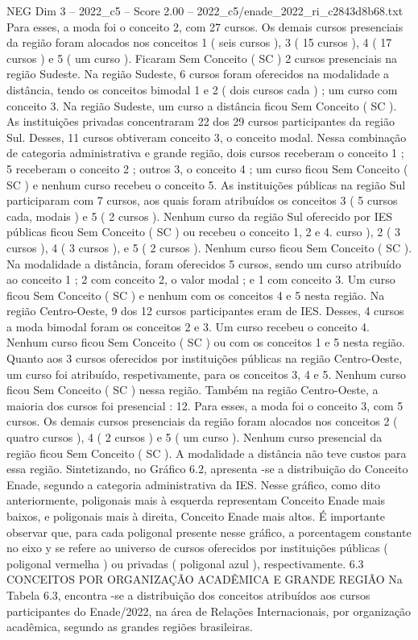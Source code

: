 \begin{textsample}{NEG Dim 3 – 2022\_c5 – Score 2.00 – 2022\_c5/enade\_2022\_ri\_c2843d8b68.txt}
Para esses, a moda foi o conceito 2, com 27 cursos.
Os demais cursos presenciais da região foram alocados nos conceitos 1 ( seis cursos ), 3 ( 15 cursos ), 4 ( 17 cursos ) e 5 ( um curso ).
Ficaram Sem Conceito ( SC ) 2 cursos presenciais na região Sudeste.
Na região Sudeste, 6 cursos foram oferecidos na modalidade a distância, tendo os conceitos bimodal 1 e 2 ( dois cursos cada ) ; um curso com conceito 3.
Na região Sudeste, um curso a distância ficou Sem Conceito ( SC ).
As instituições privadas concentraram 22 dos 29 cursos participantes da região Sul.
Desses, 11 cursos obtiveram conceito 3, o conceito modal.
Nessa combinação de categoria administrativa e grande região, dois cursos receberam o conceito 1 ; 5 receberam o conceito 2 ; outros 3, o conceito 4 ; um curso ficou Sem Conceito ( SC ) e nenhum curso recebeu o conceito 5.
As instituições públicas na região Sul participaram com 7 cursos, aos quais foram atribuídos os conceitos 3 ( 5 cursos cada, modais ) e 5 ( 2 cursos ).
Nenhum curso da região Sul oferecido por IES públicas ficou Sem Conceito ( SC ) ou recebeu o conceito 1, 2 e 4. curso ), 2 ( 3 cursos ), 4 ( 3 cursos ), e 5 ( 2 cursos ).
Nenhum curso ficou Sem Conceito ( SC ).
Na modalidade a distância, foram oferecidos 5 cursos, sendo um curso atribuído ao conceito 1 ; 2 com conceito 2, o valor modal ; e 1 com conceito 3.
Um curso ficou Sem Conceito ( SC ) e nenhum com os conceitos 4 e 5 nesta região.
Na região Centro-Oeste, 9 dos 12 cursos participantes eram de IES.
Desses, 4 cursos a moda bimodal foram os conceitos 2 e 3.
Um curso recebeu o conceito 4.
Nenhum curso ficou Sem Conceito ( SC ) ou com os conceitos 1 e 5 nesta região.
Quanto aos 3 cursos oferecidos por instituições públicas na região Centro-Oeste, um curso foi atribuído, respetivamente, para os conceitos 3, 4 e 5.
Nenhum curso ficou Sem Conceito ( SC ) nessa região.
Também na região Centro-Oeste, a maioria dos cursos foi presencial : 12.
Para esses, a moda foi o conceito 3, com 5 cursos.
Os demais cursos presenciais da região foram alocados nos conceitos 2 ( quatro cursos ), 4 ( 2 cursos ) e 5 ( um curso ).
Nenhum curso presencial da região ficou Sem Conceito ( SC ).
A modalidade a distância não teve custos para essa região.
Sintetizando, no Gráfico 6.2, apresenta -se a distribuição do Conceito Enade, segundo a categoria administrativa da IES.
Nesse gráfico, como dito anteriormente, poligonais mais à esquerda representam Conceito Enade mais baixos, e poligonais mais à direita, Conceito Enade mais altos.
É importante observar que, para cada poligonal presente nesse gráfico, a porcentagem constante no eixo y se refere ao universo de cursos oferecidos por instituições públicas ( poligonal vermelha ) ou privadas ( poligonal azul ), respectivamente. 6.3 CONCEITOS POR ORGANIZAÇÃO ACADÊMICA E GRANDE REGIÃO Na Tabela 6.3, encontra -se a distribuição dos conceitos atribuídos aos cursos participantes do Enade/2022, na área de Relações Internacionais, por organização acadêmica, segundo as grandes regiões brasileiras.

\end{textsample}
